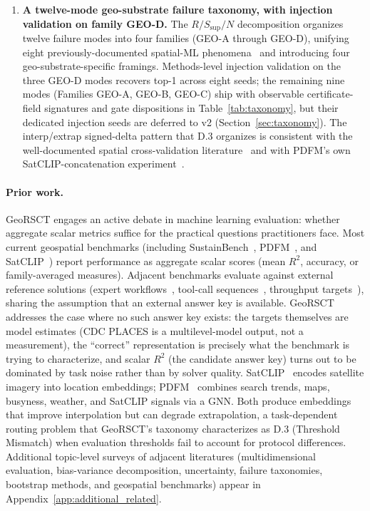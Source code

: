 \documentclass{article}
\begin{document}
\begin{enumerate}
\item \textbf{A twelve-mode geo-substrate failure taxonomy, with injection validation on family GEO-D.} The $R/S_{\text{sup}}/N$ decomposition organizes twelve failure modes into four families (GEO-A through GEO-D), unifying eight previously-documented spatial-ML phenomena~\citep{roberts2017cv,ploton2020spatial,brunsdon1996gwr,openshaw1984maup,workman2022resolution,krieger2002zip,chen2025crosswalk,oliver2005cartographic,cao2017projection,kwon2023acs} and introducing four geo-substrate-specific framings. Methods-level injection validation on the three GEO-D modes recovers top-1 across eight seeds; the remaining nine modes (Families GEO-A, GEO-B, GEO-C) ship with observable certificate-field signatures and gate dispositions in Table~\ref{tab:taxonomy}, but their dedicated injection seeds are deferred to v2 (Section~\ref{sec:taxonomy}). The interp/extrap signed-delta pattern that D.3 organizes is consistent with the well-documented spatial cross-validation literature~\citep{roberts2017cv,ploton2020spatial,mila2022nndm} and with PDFM's own SatCLIP-concatenation experiment~\citep[Table~4]{agarwal2025pdfm}.
\end{enumerate}

\paragraph{Prior work.}
GeoRSCT engages an active debate in machine learning evaluation: whether aggregate scalar metrics suffice for the practical questions practitioners face. Most current geospatial benchmarks (including SustainBench~\citep{yeh2021sustainbench}, PDFM~\citep{agarwal2025pdfm}, and SatCLIP~\citep{klemmer2023satclip}) report performance as aggregate scalar scores (mean $R^2$, accuracy, or family-averaged measures). Adjacent benchmarks evaluate against external reference solutions (expert workflows~\citep{zhang2025geoanalyst}, tool-call sequences~\citep{krechetova2025geobenchx}, throughput targets~\citep{kim2023geoycsb}), sharing the assumption that an external answer key is available. GeoRSCT addresses the case where no such answer key exists: the targets themselves are model estimates (CDC PLACES is a multilevel-model output, not a measurement), the ``correct'' representation is precisely what the benchmark is trying to characterize, and scalar $R^2$ (the candidate answer key) turns out to be dominated by task noise rather than by solver quality. SatCLIP~\citep{klemmer2023satclip} encodes satellite imagery into location embeddings; PDFM~\citep{agarwal2025pdfm} combines search trends, maps, busyness, weather, and SatCLIP signals via a GNN. Both produce embeddings that improve interpolation but can degrade extrapolation, a task-dependent routing problem that GeoRSCT's taxonomy characterizes as D.3 (Threshold Mismatch) when evaluation thresholds fail to account for protocol differences. Additional topic-level surveys of adjacent literatures (multidimensional evaluation, bias-variance decomposition, uncertainty, failure taxonomies, bootstrap methods, and geospatial benchmarks) appear in Appendix~\ref{app:additional_related}.
\end{document}
